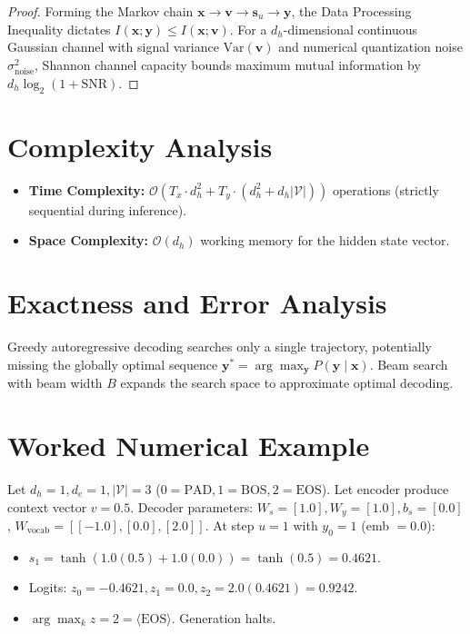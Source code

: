 \documentclass[11pt,a4paper]{article}
\theoremstyle{definition}
\begin{document}
\begin{proof}
Forming the Markov chain $\mathbf{x} \to \mathbf{v} \to \mathbf{s}_u \to \mathbf{y}$, the Data Processing Inequality dictates $I(\mathbf{x}; \mathbf{y}) \le I(\mathbf{x}; \mathbf{v})$. For a $d_h$-dimensional continuous Gaussian channel with signal variance $\text{Var}(\mathbf{v})$ and numerical quantization noise $\sigma_{\text{noise}}^2$, Shannon channel capacity bounds maximum mutual information by $d_h \log_2(1 + \text{SNR})$.
\end{proof}

\section{Complexity Analysis}

\begin{itemize}
    \item \textbf{Time Complexity:} $\mathcal{O}(T_x \cdot d_h^2 + T_y \cdot (d_h^2 + d_h |\mathcal{V}|))$ operations (strictly sequential during inference).
    \item \textbf{Space Complexity:} $\mathcal{O}(d_h)$ working memory for the hidden state vector.
\end{itemize}

\section{Exactness and Error Analysis}

Greedy autoregressive decoding searches only a single trajectory, potentially missing the globally optimal sequence $\mathbf{y}^* = \arg\max_\mathbf{y} P(\mathbf{y} \mid \mathbf{x})$. Beam search with beam width $B$ expands the search space to approximate optimal decoding.

\section{Worked Numerical Example}

Let $d_h=1, d_e=1, |\mathcal{V}|=3$ ($0=\text{PAD}, 1=\text{BOS}, 2=\text{EOS}$).
Let encoder produce context vector $v = 0.5$.
Decoder parameters: $W_s = [1.0], W_y = [1.0], b_s = [0.0]$, $W_{\text{vocab}} = [[-1.0], [0.0], [2.0]]$.
At step $u=1$ with $y_0 = 1$ (emb $= 0.0$):
\begin{itemize}
    \item $s_1 = \tanh(1.0(0.5) + 1.0(0.0)) = \tanh(0.5) = 0.4621$.
    \item Logits: $z_0 = -0.4621, z_1 = 0.0, z_2 = 2.0(0.4621) = 0.9242$.
    \item $\arg\max_k z = 2 = \langle \text{EOS} \rangle$. Generation halts.
\end{itemize}
\end{document}
